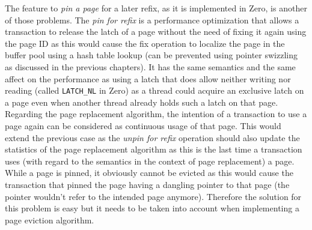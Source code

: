     The feature to \emph{pin a page} for a later refix, as it is implemented in Zero, is another of those problems. The \emph{pin for refix} is a performance optimization that allows a transaction to release the latch of a page without the need of fixing it again using the page ID as this would cause the fix operation to localize the page in the buffer pool using a hash table lookup (can be prevented using pointer swizzling as discussed in the previous chapters). It has the same semantics and the same affect on the performance as using a latch that does allow neither writing nor reading (called \lstinline{LATCH_NL} in Zero) as a thread could acquire an exclusive latch on a page even when another thread already holds such a latch on that page. Regarding the page replacement algorithm, the intention of a transaction to use a page again can be considered as continuous usage of that page. This would extend the previous case as the \emph{unpin for refix} operation should also update the statistics of the page replacement algorithm as this is the last time a transaction uses (with regard to the semantics in the context of page replacement) a page. While a page is pinned, it obviously cannot be evicted as this would cause the transaction that pinned the page having a dangling pointer to that page (the pointer wouldn't refer to the intended page anymore). Therefore the solution for this problem is easy but it needs to be taken into account when implementing a page eviction algorithm.

